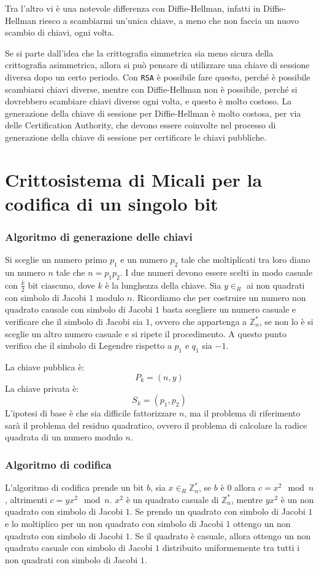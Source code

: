 Tra l'altro vi è una notevole differenza con Diffie-Hellman, infatti in Diffie-Hellman
riesco a scambiarmi un'unica chiave, a meno che non faccia un nuovo scambio di chiavi,
ogni volta.

Se si parte dall'idea che la crittografia simmetrica sia meno sicura della crittografia
asimmetrica, allora si può pensare di utilizzare una chiave di sessione diversa dopo 
un certo periodo. Con \texttt{RSA} è possibile fare questo, perché è possibile scambiarsi
chiavi diverse, mentre con Diffie-Hellman non è possibile, perché si dovrebbero scambiare
chiavi diverse ogni volta, e questo è molto costoso. La generazione della chiave di sessione 
per Diffie-Hellman è molto costosa, per via delle Certification Authority, che devono
essere coinvolte nel processo di generazione della chiave di sessione per certificare 
le chiavi pubbliche.
\section{Crittosistema di Micali per la codifica di un singolo bit}
\subsubsection{Algoritmo di generazione delle chiavi}
Si sceglie un numero primo $p_1$ e un numero $p_2$ tale che moltiplicati tra loro
diano un numero $n$ tale che $n = p_1p_2$. I due numeri devono essere scelti in modo
casuale con $\frac{k}{2}$ bit ciascuno, dove $k$ è la lunghezza della chiave. Sia 
$y \in_R$ ai non quadrati con simbolo di Jacobi $1$ modulo $n$. Ricordiamo che per 
costruire un numero non quadrato causale con simbolo di Jacobi $1$ basta scegliere un numero
casuale e verificare che il simbolo di Jacobi sia $1$, ovvero che appartenga 
a $\mathbb{Z}_n^*$, se non lo è si sceglie un altro
numero casuale e si ripete il procedimento. A questo punto verifico che il simbolo 
di Legendre rispetto a $p_1$ e $q_1$ sia $-1$. 

La chiave pubblica è:
\[
  P_k = (n, y)
\]
La chiave privata è:
\[
  S_k = (p_1, p_2)
\]
L'ipotesi di base è che sia difficile fattorizzare $n$, ma il problema di 
riferimento sarà il problema del residuo quadratico, ovvero il problema di
calcolare la radice quadrata di un numero modulo $n$.
\subsubsection{Algoritmo di codifica}
L'algoritmo di codifica prende un bit $b$, sia $x \in_R \mathbb{Z}_n^*$, se 
$b$ è $0$ allora $c = x^2 \mod n$, altrimenti $c = yx^2 \mod n$. 
$x^2$ è un quadrato casuale di $\mathbb{Z}_n^*$, mentre $yx^2$ è un 
non quadrato con simbolo di Jacobi $1$. Se prendo un quadrato con simbolo di 
Jacobi $1$ e lo moltiplico per un non quadrato con simbolo di Jacobi $1$ ottengo
un non quadrato con simbolo di Jacobi $1$. Se il quadrato è casuale, allora 
ottengo un non quadrato casuale con simbolo di Jacobi $1$ distribuito uniformemente
tra tutti i non quadrati con simbolo di Jacobi $1$.

